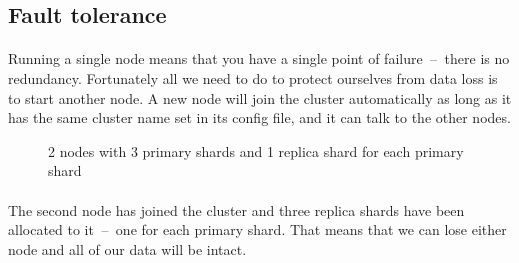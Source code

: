\documentclass{article}%
\begin{document}
\subsection{Fault tolerance}

\paragraph{} Running a single node means that you have a single point of failure  --  there is no redundancy. Fortunately all we need to do to protect ourselves from data loss is to start another node. A new node will join the cluster automatically as long as it has the same cluster name set in its config file, and it can talk to the other nodes.

\begin{figure}[h!]
	\centering
	\caption{2 nodes with 3 primary shards and 1 replica shard for each primary shard}
\end{figure}

\paragraph{} The second node has joined the cluster and three replica shards have been allocated to it  --  one for each primary shard. That means that we can lose either node and all of our data will be intact.
\end{document}
